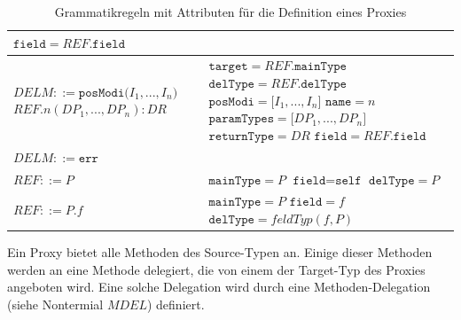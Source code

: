 \documentclass[a4paper,12pt]{article}
\begin{document}
\begin{table}[h!]
\begin{tabular}{|p{6cm}|p{8cm}|}
$\texttt{field} = \mathit{REF}\texttt{.field}$
\\
\hline
$\mathit{DELM} ::=\texttt{posModi(} \mathit{I_1},...,\mathit{I_n} \texttt{)}$\newline
$\mathit{REF}\texttt{.}n(\mathit{DP_1},...,\mathit{DP_n}):DR $  
&
$\texttt{target} = \mathit{REF}.\texttt{mainType}$\newline
$\texttt{delType} = \mathit{REF}.\texttt{delType}$\newline
$\texttt{posModi} = \mathit{[I_1},...,\mathit{I_n]}$\newline
$\texttt{name} = \mathit{n}$\newline
$\texttt{paramTypes} = \mathit{[DP_1},...,\mathit{DP_n]}$\newline
$\texttt{returnType} = \mathit{DR}$\newline
$\texttt{field} = \mathit{REF}\texttt{.field}$
\\
\hline
$\mathit{DELM} ::= \texttt{err} $  
&
\\
\hline
$\mathit{REF} ::= \mathit{P}$
& 
$\texttt{mainType} = \mathit{P}$\newline
$\texttt{field} = \texttt{self}$\newline
$\texttt{delType} = \mathit{P}$
\\
\hline
$\mathit{REF} ::= \mathit{P}\texttt{.}\mathit{f}$
&
$\texttt{mainType} = \mathit{P}$\newline
$\texttt{field} = \mathit{f}$\newline
$\texttt{delType} = \mathit{feldTyp(f,P)}$
\\
\hline
\end{tabular}
\caption{Grammatikregeln mit Attributen für die Definition eines Proxies}
 \label{tab:attrGrProxies}
\end{table}
\noindent
Ein Proxy bietet alle Methoden des Source-Typen an. Einige dieser Methoden werden an eine Methode delegiert, die von einem der Target-Typ des Proxies angeboten wird. Eine solche Delegation wird durch eine Methoden-Delegation (siehe Nontermial $\mathit{MDEL}$) definiert.
\end{document}
